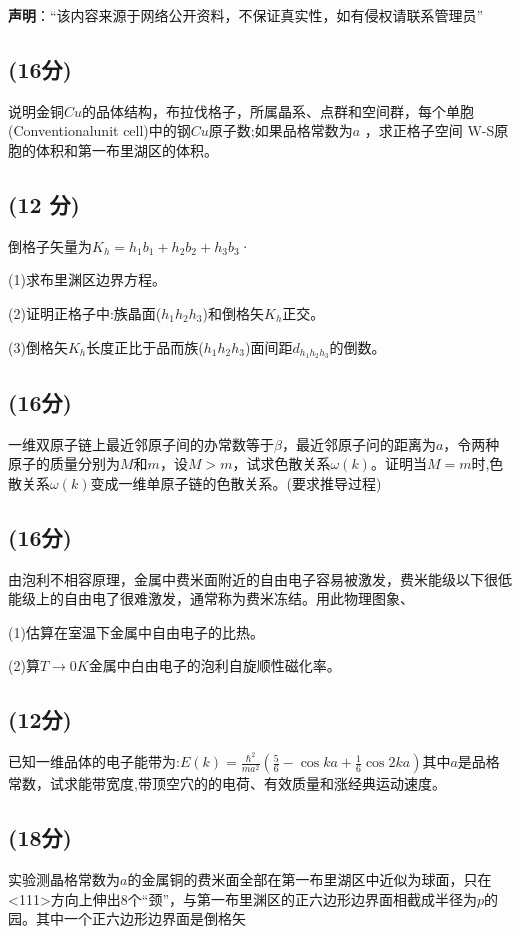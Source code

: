 
\textbf{声明}：“该内容来源于网络公开资料，不保证真实性，如有侵权请联系管理员”

\subsection{(16分)}
说明金铜$Cu$的品体结构，布拉伐格子，所属晶系、点群和空间群，每个单胞(Conventionalunit cell)中的钢$Cu$原子数;如果品格常数为$a$ ，求正格子空间 W-S原胞的体积和第一布里湖区的体积。
\subsection{(12 分)}
倒格子矢量为$K_h=h_1b_1+h_2b_2+h_3b_3$·

(1)求布里渊区边界方程。

(2)证明正格子中:族晶面($h_1h_2h_3$)和倒格矢$K_h$正交。

(3)倒格矢$K_h$长度正比于品而族($h_1h_2h_3$)面间距$d_{h_1h_2h_3}$的倒数。
\subsection{(16分)}
一维双原子链上最近邻原子间的办常数等于$\beta$，最近邻原子问的距离为$a$，令两种原子的质量分别为$M$和$m$，设$M>m$，试求色散关系$\omega(k)$。证明当$M=m$时,色散关系$\omega(k)$变成一维单原子链的色散关系。(要求推导过程)
\subsection{(16分)}
由泡利不相容原理，金属中费米面附近的自由电子容易被激发，费米能级以下很低能级上的自由电了很难激发，通常称为费米冻结。用此物理图象、

(1)估算在室温下金属中自由电子的比热。

(2)算$T\to0K$金属中白由电子的泡利自旋顺性磁化率。
\subsection{(12分)}
已知一维品体的电子能带为:$E(k) = \frac{\hbar^2}{ma^2} \left( \frac{5}{6} - \cos ka + \frac{1}{6} \cos 2ka \right)$其中$a$是品格常数，试求能带宽度,带顶空穴的的电荷、有效质量和涨经典运动速度。
\subsection{(18分)}
实验测晶格常数为$a$的金属铜的费米面全部在第一布里湖区中近似为球面，只在<111>方向上伸出8个“颈”，与第一布里渊区的正六边形边界面相截成半径为$p$的园。其中一个正六边形边界面是倒格矢
